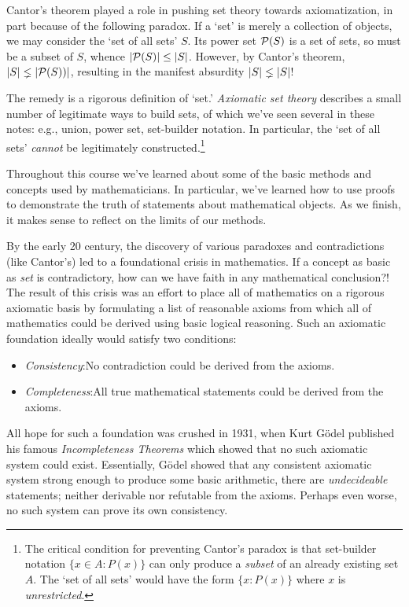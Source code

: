 Cantor's theorem played a role in pushing set theory towards axiomatization, in part because of the following paradox. If a `set' is merely a collection of objects, we may consider the `set of all sets' $S$. Its power set $\mathcal{P}(S)$ is a set of sets, so must be a subset of $S$, whence $\left| \mathcal{P}(S)\right|\le\left| S\right|$. However, by Cantor's theorem, $\left| S\right|\lneq\left| \mathcal{P}(S))\right|$, resulting in the manifest absurdity $\left| S\right|\lneq\left| S\right|$!\smallbreak

The remedy is a rigorous definition of `set.' \emph{Axiomatic set theory} describes a small number of legitimate ways to build sets, of which we've seen several in these notes: e.g., union, power set, set-builder notation. In particular, the `set of all sets' \emph{cannot} be legitimately constructed.\footnote{The critical condition for preventing Cantor's paradox is that set-builder notation $\{x\in A:P(x)\}$ can only produce a \emph{subset} of an already existing set $A$. The `set of all sets' would have the form $\{x:P(x)\}$ where $x$ is \emph{unrestricted}.}  




Throughout this course we've learned about some of the basic methods and concepts used by mathematicians. In particular, we've learned how to use proofs to demonstrate the truth of statements about mathematical objects. As we finish, it makes sense to reflect on the limits of our methods.\smallbreak

By the early 20\th{} century, the discovery of various paradoxes and contradictions (like Cantor's) led to a foundational crisis in mathematics. If a concept as basic as \emph{set} is contradictory, how can we have faith in any mathematical conclusion?! The result of this crisis was an effort to place all of mathematics on a rigorous axiomatic basis by formulating a list of reasonable axioms from which all of mathematics could be derived using basic logical reasoning. Such an axiomatic foundation ideally would satisfy two conditions:
\begin{itemize}
  \item \emph{Consistency}:\lstsp No contradiction could be derived from the axioms.
  \item \emph{Completeness}:\lstsp All true mathematical statements could be derived from the axioms.
\end{itemize}
All hope for such a foundation was crushed in 1931, when Kurt Gödel published his famous \emph{Incompleteness Theorems} which showed that no such axiomatic system could exist. Essentially, Gödel showed that any consistent axiomatic system strong enough to produce some basic arithmetic, there are \emph{undecideable} statements; neither derivable nor refutable from the axioms. Perhaps even worse, no such system can prove its own consistency.\smallbreak

